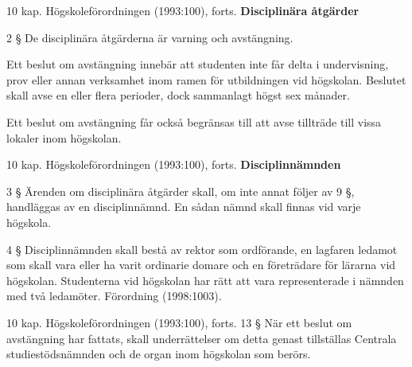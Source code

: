 \begin{frame}
  \begin{block}{10 kap. Högskoleförordningen (1993:100)\nocite{SFS1993:100}, 
    forts.}
    \textbf{Disciplinära åtgärder}

    \vspace{0.5em}
    2 § De disciplinära åtgärderna är varning och avstängning.

    \vspace{0.5em}
    Ett beslut om avstängning innebär att studenten inte får delta i 
    undervisning, prov eller annan verksamhet inom ramen för utbildningen vid 
    högskolan. Beslutet skall avse en eller flera perioder, dock sammanlagt 
    högst sex månader.

    \vspace{0.5em}
    Ett beslut om avstängning får också begränsas till att avse tillträde till 
    vissa lokaler inom högskolan.
  \end{block}
\end{frame}

\begin{frame}
  \begin{block}{10 kap. Högskoleförordningen (1993:100)\nocite{SFS1993:100}, 
    forts.}
    \textbf{Disciplinnämnden}

    \vspace{0.5em}
    3 § Ärenden om disciplinära åtgärder skall, om inte annat följer av 9 §, 
      handläggas av en disciplinnämnd. En sådan nämnd skall finnas vid varje 
      högskola.

    \vspace{0.5em}
    4 § Disciplinnämnden skall bestå av rektor som ordförande, en lagfaren 
      ledamot som skall vara eller ha varit ordinarie domare och en företrädare 
      för lärarna vid högskolan. Studenterna vid högskolan har rätt att vara 
      representerade i nämnden med två ledamöter. Förordning (1998:1003).
  \end{block}
\end{frame}

\begin{frame}
  \begin{block}{10 kap. Högskoleförordningen (1993:100)\nocite{SFS1993:100}, 
    forts.}
    13 §   När ett beslut om avstängning har fattats, skall underrättelser om 
       detta genast tillställas Centrala studiestödsnämnden och de organ inom 
       högskolan som berörs.
  \end{block}
\end{frame}

